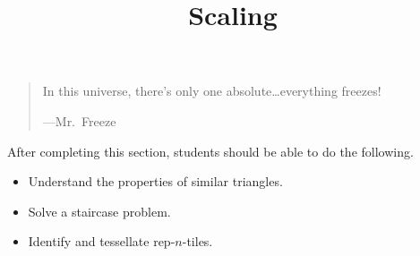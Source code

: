 \documentclass{ximera}
\title{Scaling}
\begin{document}
\begin{abstract}
\end{abstract}
\maketitle

\begin{quote}
In this universe, there's only one absolute\dots everything freezes!

\hfill---Mr.\ Freeze
\end{quote}

After completing this section, students should be able to do the following.

\begin{itemize}
\item Understand the properties of similar triangles.
\item Solve a staircase problem.
\item Identify and tessellate rep-$n$-tiles.
\end{itemize}
\end{document}
